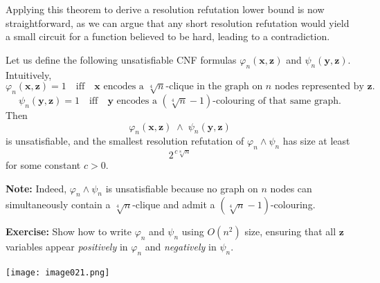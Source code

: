 Applying this theorem to derive a resolution refutation lower bound is now straightforward, as we can argue that any short resolution refutation would yield a small circuit for a function believed to be hard, leading to a contradiction.

\begin{theorem}
Let us define the following unsatisfiable CNF formulas \(\varphi_n(\mathbf{x},\mathbf{z})\) and \(\psi_n(\mathbf{y},\mathbf{z})\). Intuitively,
\[
\varphi_n(\mathbf{x},\mathbf{z}) = 1 \quad\text{iff}\quad \mathbf{x} \text{ encodes a }\sqrt[4]{n}\text{-clique in the graph on }n\text{ nodes represented by }\mathbf{z}.
\]
\[
\psi_n(\mathbf{y},\mathbf{z}) = 1 \quad\text{iff}\quad \mathbf{y} \text{ encodes a }(\sqrt[4]{n}-1)\text{-colouring of that same graph.}
\]
Then 
\[
\varphi_n(\mathbf{x},\mathbf{z}) \;\wedge\; \psi_n(\mathbf{y},\mathbf{z})
\]
is unsatisfiable, and the smallest resolution refutation of \(\varphi_n \wedge \psi_n\) has size at least
\[
2^{\,c\sqrt[8]{n}}
\]
for some constant \(c>0\).
\end{theorem}

\medskip
\noindent
\textbf{Note:} Indeed, \(\varphi_n \wedge \psi_n\) is unsatisfiable because no graph on \(n\) nodes can simultaneously contain a \(\sqrt[4]{n}\)-clique and admit a \((\sqrt[4]{n}-1)\)-colouring.

\medskip
\noindent
\textbf{Exercise:}
Show how to write \(\varphi_n\) and \(\psi_n\) using \(O(n^2)\) size, ensuring that all \(\mathbf{z}\) variables appear \emph{positively} in \(\varphi_n\) and \emph{negatively} in \(\psi_n\).

\texttt{[image: image021.png]}

